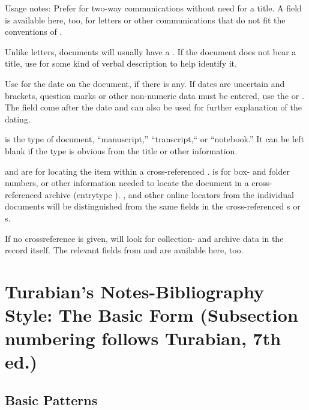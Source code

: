 \documentclass{ltxdockit}[2010/02/12]
\begin{document}
\begin{typelist}
Usage notes: Prefer  for two-way communications without need for a title. A  field is available here, too, for letters or other communications that do not fit the conventions of . 

Unlike letters,  documents will usually  have a .  If the document does not bear a title, use  for some kind of verbal description to help identify it. 

Use  for the date on the document, if there is any. If dates are uncertain and brackets, question marks or other non-numeric data must be entered, use the  or . The  field come after the date and can also be used for further explanation of the dating.  

 is the type of document, \eg ``manuscript,'' ``transcript,`` or ``notebook.'' It can be left blank if the type is obvious from the title or other information. 

 and  are for locating the item within a cross-referenced .   is for  box- and folder numbers, or other information needed to locate the document in a cross-referenced archive (entrytype ). ,  and other online locators from the individual documents will be distinguished from the same fields in the cross-referenced s or s.

If no crossreference is given,  will look for collection- and archive data in the  record itself. The relevant fields from  and  are available here, too.

\end{typelist}





\setcounter{section}{15}


\section{Turabian's Notes-Bibliography Style: The Basic Form (Subsection numbering follows Turabian, 7th ed.)}

\subsection{Basic Patterns}
\end{document}
